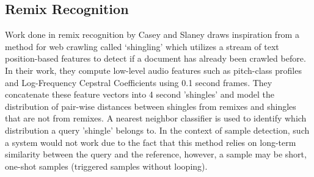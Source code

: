 \documentclass{article}
\begin{document}
\subsection{Remix Recognition}
Work done in remix recognition by Casey and Slaney \cite{caseyRemix} draws inspiration from a method for web crawling called `shingling' which utilizes a stream of text position-based features to detect if a document has already been crawled before. In their work, they compute low-level audio features such as pitch-class profiles and Log-Frequency Cepstral Coefficients using 0.1 second frames. They concatenate these feature vectors into 4 second 'shingles' and model the distribution of pair-wise distances between shingles from remixes and shingles that are not from remixes. A nearest neighbor classifier is used to identify which distribution a query 'shingle' belongs to. In the context of sample detection, such a system would not work due to the fact that this method relies on long-term similarity between the query and the reference, however, a sample may be short, one-shot samples (triggered samples without looping).
\end{document}
